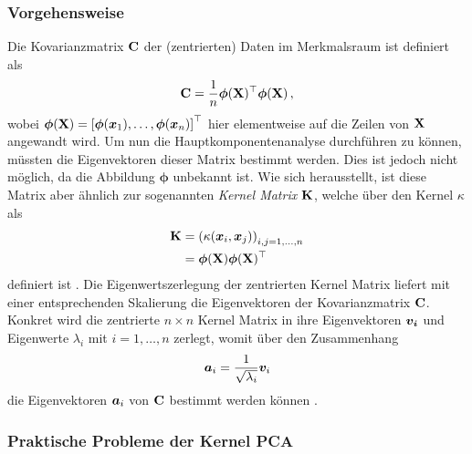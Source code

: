 \subsubsection{Vorgehensweise}
\label{ch:MethodenDerDimRed:statistisch:kPCA:Vorgehensweise}
Die Kovarianzmatrix $\mathbf{C}$ der (zentrierten) Daten im Merkmalsraum ist definiert als
\begin{equation}
	\mathbf{C} = \frac{1}{n} \bm{\phi}(\mathbf{X})^\top \bm{\phi}(\mathbf{X}) \, ,
\end{equation}
wobei $\bm{\phi}(\mathbf{X}) = \left[ \bm{\phi}(\bm{x}_1), \ldots, \bm{\phi}(\bm{x}_n) \right]^\top$ hier elementweise auf die Zeilen von $\mathbf{X}$ angewandt wird. Um nun die Hauptkomponentenanalyse durchführen zu können, müssten die Eigenvektoren dieser Matrix bestimmt werden. Dies ist jedoch nicht möglich, da die Abbildung $\bm{\phi}$ unbekannt ist. Wie sich herausstellt, ist diese Matrix aber ähnlich zur sogenannten \textit{Kernel Matrix} $\mathbf{K}$, welche über den Kernel $\kappa$ als
\begin{align}
	\mathbf{K} & = \left( \kappa(\bm{x}_i, \bm{x}_j) \right)_{i,j = 1,\ldots,n} \label{eq:kPCA:KernelMatrix_A} \\
	        & = \bm{\phi}(\mathbf{X}) \bm{\phi}(\mathbf{X})^\top \label{eq:kPCA:KernelMatrix_B}
\end{align}
definiert ist \parencite[68]{ShaweTaylor.2011}. Die Eigenwertszerlegung der zentrierten Kernel Matrix liefert mit
einer entsprechenden Skalierung die Eigenvektoren der Kovarianzmatrix $\mathbf{C}$. Konkret wird die
zentrierte $n \times n$ Kernel Matrix in ihre Eigenvektoren $\bm{v_i}$ und Eigenwerte $\lambda_i$
mit $i = 1, \ldots, n$ zerlegt, womit über den Zusammenhang
\begin{equation}
	\label{eq:kPCA:ZusammenhangEigenvektoren}
	\bm{a}_i = \frac{1}{\sqrt{\lambda_i}} \bm{v}_i
\end{equation}
die Eigenvektoren $\bm{a}_i$ von $\mathbf{C}$ bestimmt werden können \parencite[142]{ShaweTaylor.2011}.

\subsubsection{Praktische Probleme der Kernel PCA}
\label{ch:MethodenDerDimRed:statistisch:kPCA:AuswahlKF}

